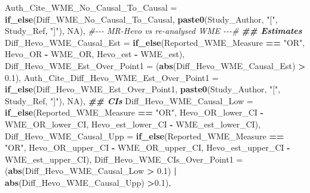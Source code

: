 \documentclass[
]{article}
\newenvironment{Shaded}{\begin{snugshade}}{\end{snugshade}}
\newcommand{\AttributeTok}[1]{\textcolor[rgb]{0.13,0.29,0.53}{#1}}
\newcommand{\CommentTok}[1]{\textcolor[rgb]{0.56,0.35,0.01}{\textit{#1}}}
\newcommand{\ConstantTok}[1]{\textcolor[rgb]{0.56,0.35,0.01}{#1}}
\newcommand{\DocumentationTok}[1]{\textcolor[rgb]{0.56,0.35,0.01}{\textbf{\textit{#1}}}}
\newcommand{\FloatTok}[1]{\textcolor[rgb]{0.00,0.00,0.81}{#1}}
\newcommand{\FunctionTok}[1]{\textcolor[rgb]{0.13,0.29,0.53}{\textbf{#1}}}
\newcommand{\NormalTok}[1]{#1}
\newcommand{\SpecialCharTok}[1]{\textcolor[rgb]{0.81,0.36,0.00}{\textbf{#1}}}
\newcommand{\StringTok}[1]{\textcolor[rgb]{0.31,0.60,0.02}{#1}}
\begin{document}
\begin{Shaded}
\begin{Highlighting}[]
    \AttributeTok{Auth\_Cite\_WME\_No\_Causal\_To\_Causal =} \FunctionTok{if\_else}\NormalTok{(Diff\_WME\_No\_Causal\_To\_Causal,}
                                                \FunctionTok{paste0}\NormalTok{(Study\_Author, }\StringTok{"["}\NormalTok{, Study\_Ref, }\StringTok{"]"}\NormalTok{),}
                                                \ConstantTok{NA}\NormalTok{),}
    \CommentTok{\#{-}{-}{-} MR{-}Hevo vs re{-}analysed WME {-}{-}{-}\# }
    \DocumentationTok{\#\# Estimates}
    \AttributeTok{Diff\_Hevo\_WME\_Causal\_Est =} \FunctionTok{if\_else}\NormalTok{(Reported\_WME\_Measure }\SpecialCharTok{==} \StringTok{"OR"}\NormalTok{,}
\NormalTok{                                       Hevo\_OR }\SpecialCharTok{{-}}\NormalTok{ WME\_OR,}
\NormalTok{                                       Hevo\_est }\SpecialCharTok{{-}}\NormalTok{ WME\_est),}
    \AttributeTok{Diff\_Hevo\_WME\_Est\_Over\_Point1 =}\NormalTok{ (}\FunctionTok{abs}\NormalTok{(Diff\_Hevo\_WME\_Causal\_Est) }\SpecialCharTok{\textgreater{}} \FloatTok{0.1}\NormalTok{),}
    \AttributeTok{Auth\_Cite\_Diff\_Hevo\_WME\_Est\_Over\_Point1 =} \FunctionTok{if\_else}\NormalTok{(Diff\_Hevo\_WME\_Est\_Over\_Point1,}
                                                      \FunctionTok{paste0}\NormalTok{(Study\_Author, }\StringTok{"["}\NormalTok{, Study\_Ref, }\StringTok{"]"}\NormalTok{),}
                                                      \ConstantTok{NA}\NormalTok{),}
    \DocumentationTok{\#\# CIs}
    \AttributeTok{Diff\_Hevo\_WME\_Causal\_Low =} \FunctionTok{if\_else}\NormalTok{(Reported\_WME\_Measure }\SpecialCharTok{==} \StringTok{"OR"}\NormalTok{,}
\NormalTok{                                       Hevo\_OR\_lower\_CI }\SpecialCharTok{{-}}\NormalTok{ WME\_OR\_lower\_CI,}
\NormalTok{                                       Hevo\_est\_lower\_CI }\SpecialCharTok{{-}}\NormalTok{ WME\_est\_lower\_CI),}
    \AttributeTok{Diff\_Hevo\_WME\_Causal\_Upp =} \FunctionTok{if\_else}\NormalTok{(Reported\_WME\_Measure }\SpecialCharTok{==} \StringTok{"OR"}\NormalTok{,}
\NormalTok{                                       Hevo\_OR\_upper\_CI }\SpecialCharTok{{-}}\NormalTok{ WME\_OR\_upper\_CI,}
\NormalTok{                                       Hevo\_est\_upper\_CI }\SpecialCharTok{{-}}\NormalTok{ WME\_est\_upper\_CI),}
    \AttributeTok{Diff\_Hevo\_WME\_CIs\_Over\_Point1 =}\NormalTok{ (}\FunctionTok{abs}\NormalTok{(Diff\_Hevo\_WME\_Causal\_Low }\SpecialCharTok{\textgreater{}} \FloatTok{0.1}\NormalTok{) }\SpecialCharTok{|} \FunctionTok{abs}\NormalTok{(Diff\_Hevo\_WME\_Causal\_Upp) }\SpecialCharTok{\textgreater{}}\FloatTok{0.1}\NormalTok{),}

\end{Highlighting}
\end{Shaded}
\end{document}
